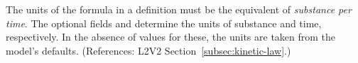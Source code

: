 The units of the  formula in a \KineticLaw definition must be
the equivalent of \emph{substance per time}.  The optional \KineticLaw
fields  and  determine the units of
substance and time, respectively.  In the absence of values for these, the
units are taken from the model's defaults.  (References: L2V2
Section~\ref{subsec:kinetic-law}.)
